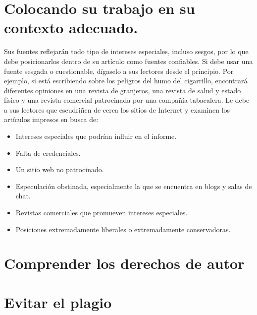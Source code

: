 \section{Colocando su trabajo en su contexto adecuado.}
Sus fuentes reflejarán todo tipo de intereses especiales, incluso sesgos, por lo que debe posicionarlos dentro de su artículo como fuentes confiables. Si debe usar una fuente sesgada o cuestionable, dígaselo a sus lectores desde el principio. Por ejemplo, si está escribiendo sobre los peligros del humo del cigarrillo, encontrará diferentes opiniones en una revista de granjeros, una revista de salud y estado físico y una revista comercial patrocinada por una compañía tabacalera. Le debe a sus lectores que escudriñen de cerca los sitios de Internet y examinen los artículos impresos en busca de:
\begin{itemize}
    \item Intereses especiales que podrían influir en el informe.
    \item Falta de credenciales.
    \item Un sitio web no patrocinado.
    \item Especulación obstinada, especialmente la que se encuentra en blogs y salas de chat.
    \item Revistas comerciales que promueven intereses especiales. 
    \item Posiciones extremadamente liberales o extremadamente conservadoras.
\end{itemize}

\section{Comprender los derechos de autor}

\section{Evitar el plagio}

